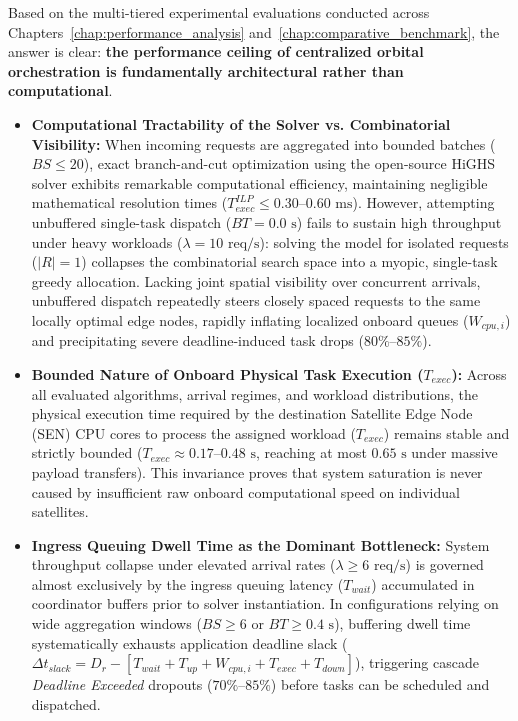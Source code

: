 Based on the multi-tiered experimental evaluations conducted across Chapters~\ref{chap:performance_analysis} and~\ref{chap:comparative_benchmark}, the answer is clear: \textbf{the performance ceiling of centralized orbital orchestration is fundamentally architectural rather than computational}.

\begin{itemize}
    \item \textbf{Computational Tractability of the Solver vs. Combinatorial Visibility:} 
    When incoming requests are aggregated into bounded batches ($BS \le 20$), exact branch-and-cut optimization using the open-source HiGHS solver exhibits remarkable computational efficiency, maintaining negligible mathematical resolution times ($T_{exec}^{ILP} \le 0.30$--$0.60\text{ ms}$). However, attempting unbuffered single-task dispatch ($BT = 0.0\text{ s}$) fails to sustain high throughput under heavy workloads ($\lambda = 10\text{ req/s}$): solving the model for isolated requests ($|R| = 1$) collapses the combinatorial search space into a myopic, single-task greedy allocation. Lacking joint spatial visibility over concurrent arrivals, unbuffered dispatch repeatedly steers closely spaced requests to the same locally optimal edge nodes, rapidly inflating localized onboard queues ($W_{cpu,i}$) and precipitating severe deadline-induced task drops ($80\%$--$85\%$). 
    \item \textbf{Bounded Nature of Onboard Physical Task Execution ($T_{exec}$):} 
    Across all evaluated algorithms, arrival regimes, and workload distributions, the physical execution time required by the destination Satellite Edge Node (SEN) CPU cores to process the assigned workload ($T_{exec}$) remains stable and strictly bounded ($T_{exec} \approx 0.17\text{--}0.48\text{ s}$, reaching at most $0.65\text{ s}$ under massive payload transfers). This invariance proves that system saturation is never caused by insufficient raw onboard computational speed on individual satellites.

    \item \textbf{Ingress Queuing Dwell Time as the Dominant Bottleneck:} 
    System throughput collapse under elevated arrival rates ($\lambda \ge 6\text{ req/s}$) is governed almost exclusively by the ingress queuing latency ($T_{wait}$) accumulated in coordinator buffers prior to solver instantiation. In configurations relying on wide aggregation windows ($BS \ge 6$ or $BT \ge 0.4\text{ s}$), buffering dwell time systematically exhausts application deadline slack ($\Delta t_{slack} = D_r - [T_{wait} + T_{up} + W_{cpu,i} + T_{exec} + T_{down}]$), triggering cascade \textit{Deadline Exceeded} dropouts ($70\%\text{--}85\%$) before tasks can be scheduled and dispatched.


\end{itemize}
